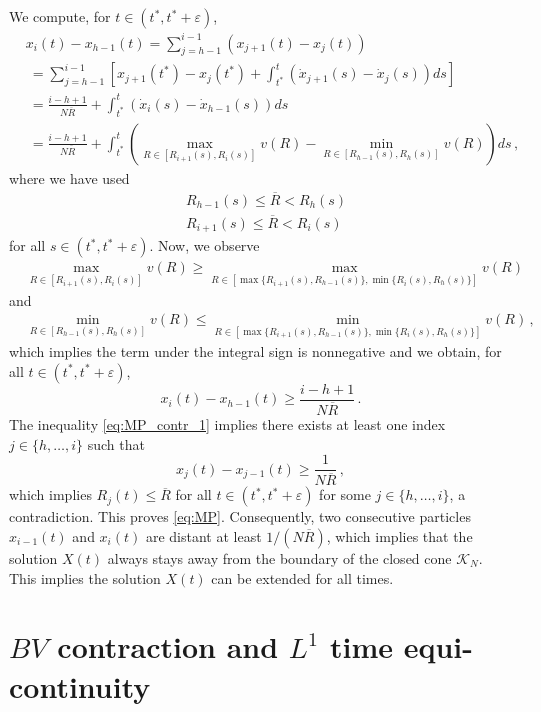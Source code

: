 \documentclass[reqno,oneside]{amsart}
\theoremstyle{plain}
\begin{document}
We compute, for $t\in (t^*,t^*+\varepsilon)$,
\begin{align*}
    & x_{i}(t)-x_{h-1}(t)=\sum_{j=h-1}^{i-1}\left(x_{j+1}(t)-x_j(t)\right)\\
    & \ = \sum_{j=h-1}^{i-1}\left[x_{j+1}(t^*)-x_j(t^*)+\int_{t^*}^t\left(\dot{x}_{j+1}(s)-\dot{x}_j(s)\right)ds\right]\\
    & \ = \frac{i-h+1}{N\overline{R}}+\int_{t^*}^t\left(\dot{x}_{i}(s)-\dot{x}_{h-1}(s)\right)ds\\
    & \ = \frac{i-h+1}{N\overline{R}}+\int_{t^*}^t\left(\max_{R\in [R_{i+1}(s),R_i(s)]}v(R)-\min_{R\in [R_{h-1}(s),R_h(s)]}v(R)\right)ds\,,
\end{align*}
where we have used
\begin{align*}
    & R_{h-1}(s)\leq \overline{R}<R_h(s)\\
    & R_{i+1}(s)\leq \overline{R}<R_i(s)
\end{align*}
for all $s\in (t^*,t^*+\varepsilon)$. Now, we observe
\begin{align*}
    & \max_{R\in [R_{i+1}(s),R_i(s)]}v(R)\geq \max_{R\in[\max\{R_{i+1}(s),R_{h-1}(s)\},\min\{R_i(s),R_h(s)\}]} v(R)
\end{align*}
and
\begin{align*}
    & \min_{R\in [R_{h-1}(s),R_h(s)]}v(R)\leq \min_{R\in[\max\{R_{i+1}(s),R_{h-1}(s)\},\min\{R_i(s),R_h(s)\}]}v(R)\,,
\end{align*}
which implies the term under the integral sign is nonnegative and we obtain, for all $t\in (t^*,t^*+\varepsilon)$,
\begin{equation}\label{eq:MP_contr_1}
    x_{i}(t)-x_{h-1}(t)\geq \frac{i-h+1}{N\overline{R}}\,.
\end{equation}
The inequality \eqref{eq:MP_contr_1} implies there exists at least one index $j\in\{h,\ldots,i\}$ such that
\[x_{j}(t)-x_{j-1}(t)\geq \frac{1}{N\overline{R}}\,,\]
which implies $R_j(t)\leq \overline{R}$ for all $t\in (t^*,t^*+\varepsilon)$ for some $j\in\{h,\ldots,i\}$, a contradiction. This proves \eqref{eq:MP}. Consequently, two consecutive particles $x_{i-1}(t)$ and $x_{i}(t)$ are distant at least $1/(N\overline{R})$, which implies that the solution $X(t)$ always stays away from the boundary of the closed cone $\mathcal{K}_N$. This implies the solution $X(t)$ can be extended for all times.
\endproof

\section{$BV$ contraction and $L^1$ time equi-continuity}
\end{document}
